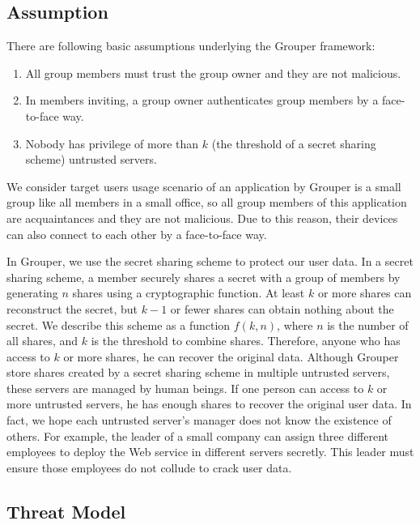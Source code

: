 \documentclass[twocolumn,10pt]{article}
\begin{document}
\subsection{Assumption}

There are following basic assumptions underlying the Grouper framework:

\begin{enumerate}
	\setlength{\itemsep}{1pt}
	\setlength{\parskip}{0pt}
	\setlength{\parsep}{0pt}
	\item All group members must trust the group owner and they are not malicious.
	\item In members inviting, a group owner authenticates group members by a face-to-face way.
	\item Nobody has privilege of more than $k$ (the threshold of a secret sharing scheme) untrusted servers.
\end{enumerate}

We consider target users usage scenario of an application by Grouper is a small group like all members in a small office, so all group members of this application are acquaintances and they are not malicious. Due to this reason, their devices can also connect to each other by a face-to-face way.

In Grouper, we use the secret sharing scheme to protect our user data. In a secret sharing scheme, a member securely shares a secret with a group of members by generating $n$ shares using a cryptographic function\cite{smith2013layered}. 
At least $k$ or more shares can reconstruct the secret, but $k-1$ or fewer shares can obtain nothing about the secret\cite{pang2005new}. 
We describe this scheme as a function $f(k, n)$, where $n$ is the number of all shares, and $k$ is the threshold to combine shares. 
Therefore, anyone who has access to $k$ or more shares, he can recover the original data. Although Grouper store shares created by a secret sharing scheme in multiple untrusted servers, these servers are managed by human beings. If one person can access to $k$ or more untrusted servers, he has enough shares to recover the original user data. In fact, we hope each untrusted server's manager does not know the existence of others. For example, the leader of a small company can assign three different employees to deploy the Web service in different servers secretly. This leader must ensure those employees do not collude to crack user data.

\subsection{Threat Model}
\end{document}
